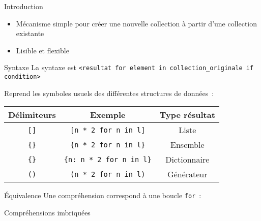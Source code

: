 \begin{frame}{Introduction}
  \begin{itemize}[<+->]
    \item Mécanisme simple pour créer une nouvelle collection à partir d'une collection existante
    \item Lisible et flexible
  \end{itemize}
\end{frame}

\begin{frame}{Syntaxe}
  La syntaxe est \texttt{<resultat for element in collection\_originale if condition>}

  Reprend les symboles usuels des différentes structures de données~:

  \begin{center}
    \begin{tabular}{ccc}
      \textbf{Délimiteurs} & \textbf{Exemple} & \textbf{Type résultat} \\
      \toprule
      \texttt{[]} & \texttt{[n * 2 for n in l]} & Liste \\
      \texttt{\{\}} & \texttt{\{n * 2 for n in l\}} & Ensemble \\
      \texttt{\{\}} & \texttt{\{n: n * 2 for n in l\}} & Dictionnaire \\
      \texttt{()} & \texttt{(n * 2 for n in l)} & Générateur \\
    \end{tabular}
  \end{center}
\end{frame}

\begin{frame}{Équivalence}
  Une compréhension correspond à une boucle \texttt{for}~:

\end{frame}

\begin{frame}{Compréhensions imbriquées}
\end{frame}
